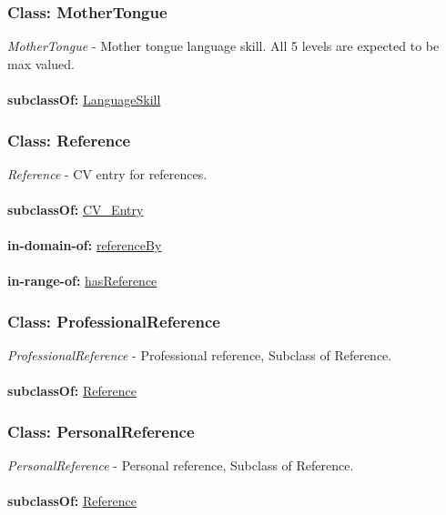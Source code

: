 \documentclass[a4paper,12pt]{article}
\numberwithin{equation}{section}
\begin{document}
\subsubsection{Class: MotherTongue}\hypertarget{MotherTongue}{}
\textit{MotherTongue} - Mother tongue language skill. All 5 levels are expected to be max valued.
\\\\
\textbf{subclassOf:} \hyperlink{LanguageSkill}{LanguageSkill}

\subsubsection{Class: Reference}\hypertarget{Reference}{}
\textit{Reference} - CV entry for references.
\\\\
\textbf{subclassOf:} \hyperlink{CV\_Entry}{CV\_Entry}
\\\\
\textbf{in-domain-of:} \hyperlink{referenceBy}{referenceBy}
\\\\
\textbf{in-range-of:} \hyperlink{hasReference}{hasReference}

\subsubsection{Class: ProfessionalReference}\hypertarget{ProfessionalReference}{}
\textit{ProfessionalReference} - Professional reference, Subclass of Reference.
\\\\
\textbf{subclassOf:} \hyperlink{Reference}{Reference}

\subsubsection{Class: PersonalReference}\hypertarget{PersonalReference}{}
\textit{PersonalReference} - Personal reference, Subclass of Reference.
\\\\
\textbf{subclassOf:} \hyperlink{Reference}{Reference}
\end{document}
